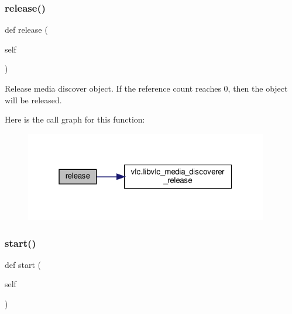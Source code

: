 \subsubsection{\texorpdfstring{release()}{release()}}
{\footnotesize\ttfamily def release (\begin{DoxyParamCaption}\item[{}]{self }\end{DoxyParamCaption})}

\begin{DoxyVerb}Release media discover object. If the reference count reaches 0, then
the object will be released.
\end{DoxyVerb}
 Here is the call graph for this function\+:
\nopagebreak
\begin{figure}[H]
\begin{center}
\leavevmode
\includegraphics[width=301pt]{classvlc_1_1_media_discoverer_a4cd51e19135e5ad4a19eae3ea9c60537_cgraph}
\end{center}
\end{figure}
\mbox{\label{classvlc_1_1_media_discoverer_af1af6ddf04f00f958949618f79c33b82}} 
\subsubsection{\texorpdfstring{start()}{start()}}
{\footnotesize\ttfamily def start (\begin{DoxyParamCaption}\item[{}]{self }\end{DoxyParamCaption})}

